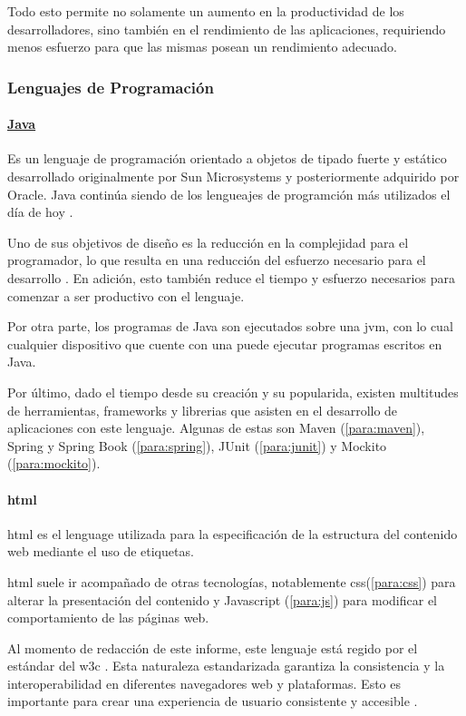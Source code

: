 Todo esto permite no solamente un aumento en la productividad de los desarrolladores, sino también en el rendimiento de las aplicaciones, requiriendo menos esfuerzo para que las mismas posean un rendimiento adecuado.

\subsubsection{Lenguajes de Programación}
\paragraph{\href{https://www.java.com/es/}{Java}}
Es un lenguaje de programación orientado a objetos de tipado fuerte y estático desarrollado originalmente por Sun Microsystems y posteriormente adquirido por Oracle. Java continúa siendo de los lengueajes de programción más utilizados el día de hoy \cite{devSurvey2024}.

Uno de sus objetivos de diseño es la reducción en la complejidad para el programador, lo que resulta en una reducción del esfuerzo necesario para el desarrollo \cite{eckelJava}. En adición, esto también reduce el tiempo y esfuerzo necesarios para comenzar a ser productivo con el lenguaje.

Por otra parte, los programas de Java son ejecutados sobre una \acrfull{jvm}, con lo cual cualquier dispositivo que cuente con una puede ejecutar programas escritos en Java.

Por último, dado el tiempo desde su creación y su popularida, existen multitudes de herramientas, frameworks y librerias que asisten en el desarrollo de aplicaciones con este lenguaje. Algunas de estas son Maven (\cref{para:maven}), Spring y Spring Book (\cref{para:spring}), JUnit (\cref{para:junit}) y Mockito (\cref{para:mockito}).

\paragraph{\acrshort{html}}\label{para:html}
\acrfull{html} es el lenguage utilizada para la especificación de la estructura del contenido web mediante el uso de etiquetas.

\acrshort{html} suele ir acompañado de otras tecnologías, notablemente \acrshort{css}(\cref{para:css}) para alterar la presentación del contenido y Javascript (\cref{para:js}) para modificar el comportamiento de las páginas web.

Al momento de redacción de este informe, este lenguaje está regido por el estándar del \acrfull{w3c} \cite{w3cHTML}. Esta naturaleza estandarizada garantiza la consistencia y la interoperabilidad en diferentes navegadores web y plataformas. Esto es importante para crear una experiencia de usuario consistente y accesible \cite{duckettHTMLCSS}.

